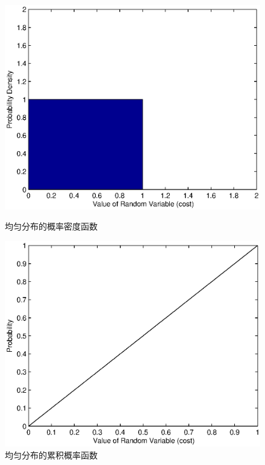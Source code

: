 \begin{figure}[tb] 
  \begin{minipage}[t]{0.5\linewidth} 
    \centering 
    \includegraphics[width = \textwidth]{bayesian_uniform_density_scheme.eps} 
    \caption{均匀分布的概率密度函数} 
    \label{fig:chap_bayesian:uniform_density_scheme} 
  \end{minipage}%
  \begin{minipage}[t]{0.5\linewidth} 
    \centering 
    \includegraphics[width=\textwidth]{bayesian_uniform_cdf_scheme.eps} 
    \caption{均匀分布的累积概率函数} 
    \label{fig:chap_bayesian:uniform_cdf_schem} 
  \end{minipage} 
\end{figure}
